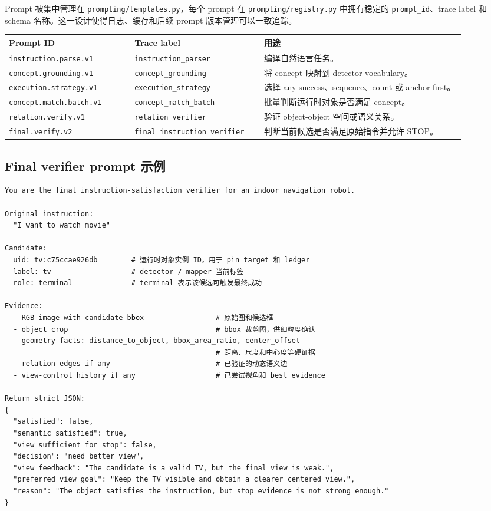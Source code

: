 \documentclass[UTF8,zihao=-4]{ctexart}
\begin{document}
Prompt 被集中管理在 \texttt{prompting/templates.py}，每个 prompt 在
\texttt{prompting/registry.py} 中拥有稳定的 \texttt{prompt\_id}、trace label
和 schema 名称。这一设计使得日志、缓存和后续 prompt 版本管理可以一致追踪。

\begin{longtable}{p{0.25\linewidth}p{0.25\linewidth}p{0.40\linewidth}}
\toprule
\textbf{Prompt ID} & \textbf{Trace label} & \textbf{用途} \\
\midrule
\texttt{instruction.parse.v1} & \texttt{instruction\_parser} & 编译自然语言任务。\\
\texttt{concept.grounding.v1} & \texttt{concept\_grounding} & 将 concept 映射到 detector vocabulary。\\
\texttt{execution.strategy.v1} & \texttt{execution\_strategy} & 选择 any-success、sequence、count 或 anchor-first。\\
\texttt{concept.match.batch.v1} & \texttt{concept\_match\_batch} & 批量判断运行时对象是否满足 concept。\\
\texttt{relation.verify.v1} & \texttt{relation\_verifier} & 验证 object-object 空间或语义关系。\\
\texttt{final.verify.v2} & \texttt{final\_instruction\_verifier} & 判断当前候选是否满足原始指令并允许 STOP。\\
\bottomrule
\end{longtable}

\subsection{Final verifier prompt 示例}

\begin{lstlisting}[style=pseudo,caption={Final verifier prompt 片段}]
You are the final instruction-satisfaction verifier for an indoor navigation robot.

Original instruction:
  "I want to watch movie"

Candidate:
  uid: tv:c75ccae926db        # 运行时对象实例 ID，用于 pin target 和 ledger
  label: tv                   # detector / mapper 当前标签
  role: terminal              # terminal 表示该候选可触发最终成功

Evidence:
  - RGB image with candidate bbox                 # 原始图和候选框
  - object crop                                   # bbox 裁剪图，供细粒度确认
  - geometry facts: distance_to_object, bbox_area_ratio, center_offset
                                                  # 距离、尺度和中心度等硬证据
  - relation edges if any                         # 已验证的动态语义边
  - view-control history if any                   # 已尝试视角和 best evidence

Return strict JSON:
{
  "satisfied": false,
  "semantic_satisfied": true,
  "view_sufficient_for_stop": false,
  "decision": "need_better_view",
  "view_feedback": "The candidate is a valid TV, but the final view is weak.",
  "preferred_view_goal": "Keep the TV visible and obtain a clearer centered view.",
  "reason": "The object satisfies the instruction, but stop evidence is not strong enough."
}
\end{lstlisting}
\end{document}
